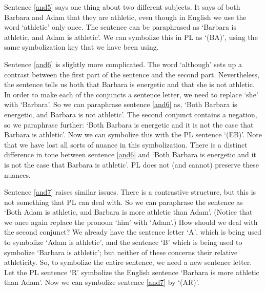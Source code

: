 Sentence \ref{and5} says one thing about two different subjects. It says of both Barbara and Adam that they are athletic, even though in English we use the word ‘athletic’ only once. The sentence can be paraphrased as ‘Barbara is athletic, and Adam is athletic’. We can symbolize this in PL as ‘(B\eand A)’, using the same symbolization key that we have been using.

Sentence \ref{and6} is slightly more complicated. The word ‘although’ sets up a contrast between the first part of the sentence and the second part. Nevertheless, the sentence tells us both that Barbara is energetic and that she is not athletic. In order to make each of the conjuncts a sentence letter, we need to replace ‘she’ with ‘Barbara’. So we can paraphrase sentence \ref{and6} as, ‘Both Barbara is energetic, and Barbara is not athletic’. The second conjunct contains a negation, so we paraphrase further: ‘Both Barbara is energetic and it is not the case that Barbara is athletic’. Now we can symbolize this with the PL sentence ‘(E\eand \enot B)’. Note that we have lost all sorts of nuance in this symbolization. There is a distinct difference in tone between sentence \ref{and6} and ‘Both Barbara is energetic and it is not the case that Barbara is athletic’. PL does not (and cannot) preserve these nuances.

Sentence \ref{and7} raises similar issues. There is a contrastive structure, but this is not something that PL can deal with. So we can paraphrase the sentence as ‘Both Adam is athletic, and Barbara is more athletic than Adam’. (Notice that we once again replace the pronoun ‘him’ with ‘Adam’.) How should we deal with the second conjunct? We already have the sentence letter ‘A’, which is being used to symbolize ‘Adam is athletic’, and the sentence ‘B’ which is being used to symbolize ‘Barbara is athletic’; but neither of these concerns their relative athleticity. So, to symbolize the entire sentence, we need a new sentence letter. Let the PL sentence ‘R’ symbolize the English sentence ‘Barbara is more athletic than Adam’. Now we can symbolize sentence  \ref{and7} by ‘(A\eand R)’.


